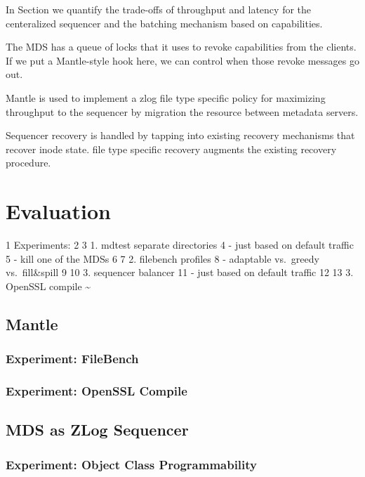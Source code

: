 \documentclass[10pt,twocolumn]{article}
\begin{document}
In Section we quantify the trade-offs of throughput and latency for the
centeralized sequencer and the batching mechanism based on capabilities.

The MDS has a queue of locks that it uses to revoke capabilities from
the clients. If we put a Mantle-style hook here, we can control when
those revoke messages go out.

Mantle is used to implement a zlog file type specific policy for maximizing
throughput to the sequencer by migration the resource between metadata servers.

Sequencer recovery is handled by tapping into existing recovery mechanisms
that recover inode state. file type specific recovery augments the existing
recovery procedure.


\section{Evaluation}\label{evaluation}

1 Experiments: 2 3 1. mdtest separate directories 4 - just based on
default traffic 5 - kill one of the MDSs 6 7 2. filebench profiles 8 -
adaptable vs.~greedy vs.~fill\&spill 9 10 3. sequencer balancer 11 -
just based on default traffic 12 13 3. OpenSSL compile
\textasciitilde{}\\\label{evaluation}

\subsection{Mantle}\label{mantle}

\subsubsection{Experiment: FileBench}\label{experiment-filebench}

\subsubsection{Experiment: OpenSSL
Compile}\label{experiment-openssl-compile}

\subsection{MDS as ZLog Sequencer}\label{mds-as-zlog-sequencer}

\subsubsection{Experiment: Object Class
Programmability}\label{experiment-object-class-programmability}
\end{document}
